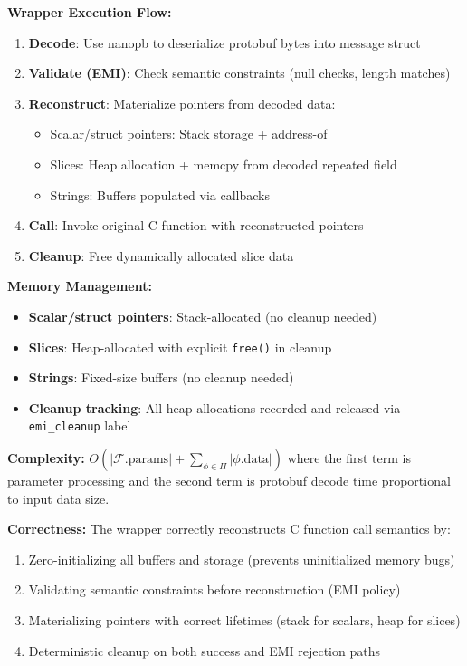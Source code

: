 \textbf{Wrapper Execution Flow:}
\begin{enumerate}
    \item \textbf{Decode}: Use nanopb to deserialize protobuf bytes into message struct
    \item \textbf{Validate (EMI)}: Check semantic constraints (null checks, length matches)
    \item \textbf{Reconstruct}: Materialize pointers from decoded data:
    \begin{itemize}
        \item Scalar/struct pointers: Stack storage + address-of
        \item Slices: Heap allocation + memcpy from decoded repeated field
        \item Strings: Buffers populated via callbacks
    \end{itemize}
    \item \textbf{Call}: Invoke original C function with reconstructed pointers
    \item \textbf{Cleanup}: Free dynamically allocated slice data
\end{enumerate}

\textbf{Memory Management:}
\begin{itemize}
    \item \textbf{Scalar/struct pointers}: Stack-allocated (no cleanup needed)
    \item \textbf{Slices}: Heap-allocated with explicit \texttt{free()} in cleanup
    \item \textbf{Strings}: Fixed-size buffers (no cleanup needed)
    \item \textbf{Cleanup tracking}: All heap allocations recorded and released via \texttt{emi\_cleanup} label
\end{itemize}

\textbf{Complexity:} $O(|\mathcal{F}.\text{params}| + \sum_{\phi \in \Pi} |\phi.\text{data}|)$ where the first term is parameter processing and the second term is protobuf decode time proportional to input data size.

\textbf{Correctness:} The wrapper correctly reconstructs C function call semantics by:
\begin{enumerate}
    \item Zero-initializing all buffers and storage (prevents uninitialized memory bugs)
    \item Validating semantic constraints before reconstruction (EMI policy)
    \item Materializing pointers with correct lifetimes (stack for scalars, heap for slices)
    \item Deterministic cleanup on both success and EMI rejection paths
\end{enumerate}
